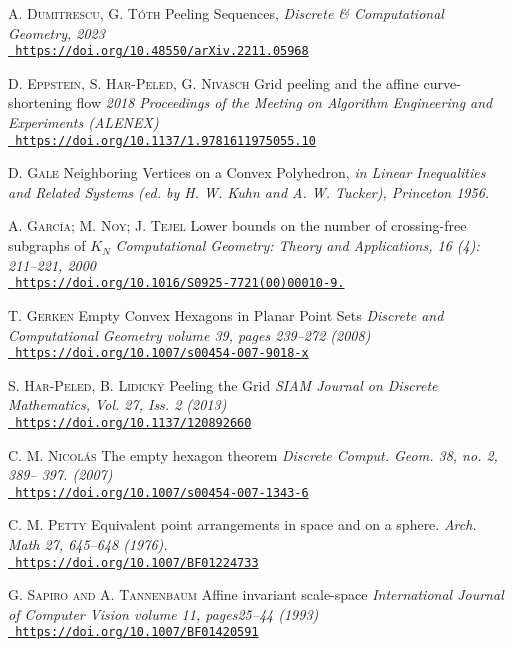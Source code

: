 \documentclass[a4paper,UKenglish,cleveref, autoref, thm-restate]{lipics-v2021}
\begin{document}
\begin{thebibliography}{1}
\textsc{A. Dumitrescu, G. Tóth} Peeling Sequences, \textit{Discrete \& Computational Geometry, 2023}  \\\href{https://doi.org/10.48550/arXiv.2211.05968}{\tt\small 
https://doi.org/10.48550/arXiv.2211.05968}

\textsc{D. Eppstein, S. Har-Peled, G. Nivasch} Grid peeling and the affine curve-shortening flow \textit{2018 Proceedings of the Meeting on Algorithm Engineering and Experiments (ALENEX)} \\\href{https://doi.org/10.1137/1.9781611975055.10}{\tt\small 
https://doi.org/10.1137/1.9781611975055.10}

\textsc{D. Gale} Neighboring Vertices on a Convex Polyhedron, \textit{in Linear Inequalities and Related Systems (ed. by H. W. Kuhn and A. W. Tucker), Princeton 1956.}

\textsc{A. Garc\'ia; M. Noy; J. Tejel} Lower bounds on the number of crossing-free subgraphs of $K_{N}$ \textit{Computational Geometry: Theory and Applications, 16 (4): 211–221, 2000} \\\href{https://doi.org/10.1016/S0925-7721(00)00010-9.}{\tt\small 
https://doi.org/10.1016/S0925-7721(00)00010-9.}

\textsc{T. Gerken} Empty Convex Hexagons in Planar Point Sets \textit{Discrete and Computational Geometry volume 39, pages 239–272 (2008)} \\\href{https://doi.org/10.1007/s00454-007-9018-x}{\tt\small 
https://doi.org/10.1007/s00454-007-9018-x}

\textsc{S. Har-Peled, B. Lidick\'y} Peeling the Grid \textit{SIAM Journal on Discrete Mathematics, Vol. 27, Iss. 2 (2013)} \\\href{https://doi.org/10.1137/120892660}{\tt\small 
https://doi.org/10.1137/120892660}

\textsc{C. M. Nicol\'as} The empty hexagon theorem \textit{Discrete Comput. Geom. 38, no. 2, 389–
397. (2007)} \\\href{https://doi.org/10.1007/s00454-007-1343-6}{\tt\small 
https://doi.org/10.1007/s00454-007-1343-6}

\textsc{C. M. Petty} Equivalent point arrangements in space and on a sphere. \textit{Arch. Math 27, 645–648 (1976).} \\\href{https://doi.org/10.1007/BF01224733}{\tt\small 
https://doi.org/10.1007/BF01224733}

\textsc{G. Sapiro and A. Tannenbaum} Affine invariant scale-space \textit{International Journal of Computer Vision volume 11, pages25–44 (1993)} \\\href{https://doi.org/10.1007/BF01420591}{\tt\small 
https://doi.org/10.1007/BF01420591}


\end{thebibliography}
\end{document}
